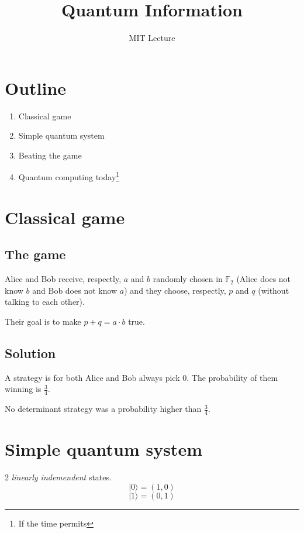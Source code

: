 \documentclass[10pt,a4paper]{article}
\title{Quantum Information}
\author{MIT Lecture}
\newcommand{\FF}{\mathbb{F}}
\newcommand{\ket}[1]{|#1\rangle}
\begin{document}
	\zeustitle

	\setcounter{section}{-1}
	\section{Outline}
	\begin{enumerate}
		\item Classical game
		\item Simple quantum system
		\item Beating the game
		\item Quantum computing today\footnote{If the time permits}
	\end{enumerate}

	\section{Classical game}
	\subsection{The game}

	Alice and Bob receive, respectly, $a$ and $b$ randomly chosen in $\FF_2$ (Alice does not know $b$ and Bob does not know $a$) and they choose, respectly, $p$ and $q$ (without talking to each other).

	Their goal is to make $ p + q = a \cdot b $ true.
	
	\subsection{Solution}

	A strategy is for both Alice and Bob always pick $0$. The probability of them winning is $\frac{3}{4}$.

	No determinant strategy was a probability higher than $\frac{3}{4}$.

	\section{Simple quantum system}

	\begin{defn}[Qubit]
		2 \emph{linearly indemendent} states.
		\[\ket{0} = (1, 0)\]
		\[\ket{1} = (0, 1)\]
	\end{defn}
\end{document}
